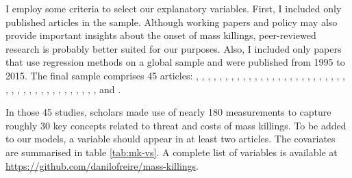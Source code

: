 I employ some criteria to select our explanatory variables. First, I included only published articles in the sample. Although working papers and policy may also provide important insights about the onset of mass killings, peer-reviewed research is probably better suited for our purposes. Also, I included only papers that use regression methods on a global sample and were published from 1995 to 2015. The final sample comprises 45 articles: \citet{anderton2015new}, \citet{balcells2010rivalry, balcells2011continuation}, \citet{besanccon2005relative}, \citet{bulutgil2015social}, \citet{bundervoet2009livestock}, \citet{clayton2016civilianizing}, \citet{colaresi2008kill}, \citet{downes2006desperate, downes2007restraint},  \citet{easterly2006development}, \citet{eck2007one}, \citet{esteban2015strategic}, \citet{fazal2015particular}, \citet{fjelde2014weakening}, \citet{goldsmith2013forecasting}, \citet{harff2003no}, \citet{joshi2017kills}, \citet{kim2010makes}, \citet{kim2016revolutionary}, \citet{kisangani2007political}, \citet{koren2017means}, \citet{krain1997state}, \citet{manekin2013violence}, \citet{mcdoom2013killed,mcdoom2014predicting}, \citet{melander2009new}, \citet{montalvo2008discrete}, \citet{pilster2016differentiation}, \citet{querido2009state}, \citet{raleigh2012violence}, \citet{rost2013will}, \citet{rummel1995democracy}, \citet{schneider2013accounting}, \citet{siroky2015empire}, \citet{stanton2015regulating}, \citet{sullivan2012blood}, \citet{tir2008domestic}, \citet{ulfelder2008assessing}, \citet{ulfelder2012forecasting}, \citet{uzonyi2015civil, uzonyi2016domestic} \citet{valentino2004draining}, \citet{valentino2006covenants}, \citet{verpoorten2012leave}, \citet{wayman2010explaining}, \citet{wig2016local}, and \citet{yanagizawa2014propaganda}.

In those 45 studies, scholars made use of nearly 180 measurements to capture roughly 30 key concepts related to threat and costs of mass killings. To be added to our models, a variable should appear in at least two articles. The covariates are summarised in table \ref{tab:mk-vs}. A complete list of variables is available at \href{https://github.com/danilofreire/mass-killings}{https://github.com/danilofreire/mass-killings}.


